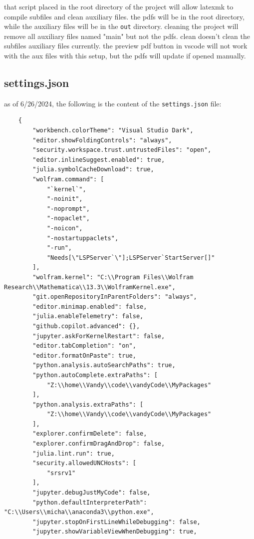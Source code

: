 \documentclass[../../main.tex]{subfiles} %
\begin{document}
that script placed in the root directory of the project will allow latexmk to compile subfiles and clean auxiliary files. the pdfs will be in the root directory, while the auxiliary files will be in the \texttt{out} directory. cleaning the project will remove all auxiliary files named "main" but not the pdfs. clean doesn't clean the subfiles auxiliary files currently. the preview pdf button in vscode will not work with the aux files with this setup, but the pdfs will update if opened manually. 

\subsection{settings.json}
as of 6/26/2024, the following is the content of the \texttt{settings.json} file:
\begin{lstlisting}
    {
        "workbench.colorTheme": "Visual Studio Dark",
        "editor.showFoldingControls": "always",
        "security.workspace.trust.untrustedFiles": "open",
        "editor.inlineSuggest.enabled": true,
        "julia.symbolCacheDownload": true,
        "wolfram.command": [
            "`kernel`",
            "-noinit",
            "-noprompt",
            "-nopaclet",
            "-noicon",
            "-nostartuppaclets",
            "-run",
            "Needs[\"LSPServer`\"];LSPServer`StartServer[]"
        ],
        "wolfram.kernel": "C:\\Program Files\\Wolfram Research\\Mathematica\\13.3\\WolframKernel.exe",
        "git.openRepositoryInParentFolders": "always",
        "editor.minimap.enabled": false,
        "julia.enableTelemetry": false,
        "github.copilot.advanced": {},
        "jupyter.askForKernelRestart": false,
        "editor.tabCompletion": "on",
        "editor.formatOnPaste": true,
        "python.analysis.autoSearchPaths": true,
        "python.autoComplete.extraPaths": [
            "Z:\\home\\Vandy\\code\\vandyCode\\MyPackages"
        ],
        "python.analysis.extraPaths": [
            "Z:\\home\\Vandy\\code\\vandyCode\\MyPackages"
        ],
        "explorer.confirmDelete": false,
        "explorer.confirmDragAndDrop": false,
        "julia.lint.run": true,
        "security.allowedUNCHosts": [
            "srsrv1"
        ],
        "jupyter.debugJustMyCode": false,
        "python.defaultInterpreterPath": "C:\\Users\\micha\\anaconda3\\python.exe",
        "jupyter.stopOnFirstLineWhileDebugging": false,
        "jupyter.showVariableViewWhenDebugging": true,
    

\end{lstlisting}
\end{document}
